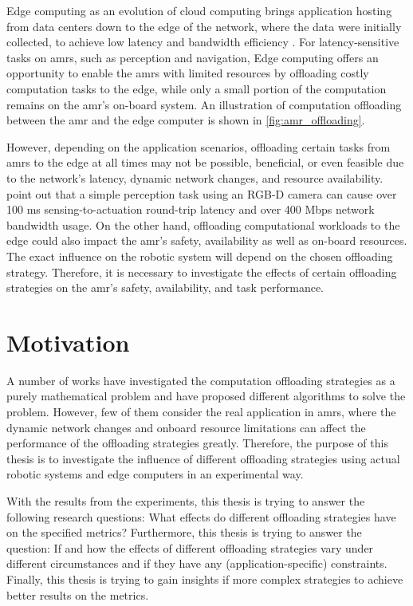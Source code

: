 Edge computing as an evolution of cloud computing brings application hosting from data centers down to the edge of the network, where the data were initially collected, to achieve low latency and bandwidth efficiency \cite{Lin2019}. For latency-sensitive tasks on \glspl{amr}, such as perception and navigation, Edge computing offers an opportunity to enable the \glspl{amr} with limited resources by offloading costly computation tasks to the edge, while only a small portion of the computation remains on the \gls{amr}'s on-board system. An illustration of computation offloading between the \gls{amr} and the edge computer is shown in \cref{fig:amr_offloading}.

However, depending on the application scenarios, offloading certain tasks from \glspl{amr} to the edge at all times may not be possible, beneficial, or even feasible due to the network's latency, dynamic network changes, and resource availability. \citeauthor*{Baxi2022} \cite{Baxi2022} point out that a simple perception task using an RGB-D camera can cause over 100 ms sensing-to-actuation round-trip latency and over 400 Mbps network bandwidth usage. On the other hand, offloading computational workloads to the edge could also impact the \gls{amr}'s safety, availability as well as on-board resources. The exact influence on the robotic system will depend on the chosen offloading strategy. Therefore, it is necessary to investigate the effects of certain offloading strategies on the \gls{amr}'s safety, availability, and task performance.

\section{Motivation}\label{sec:motivation}

A number of works have investigated the computation offloading strategies as a purely mathematical problem and have proposed different algorithms to solve the problem. However, few of them consider the real application in \glspl{amr}, where the dynamic network changes and onboard resource limitations can affect the performance of the offloading strategies greatly. Therefore, the purpose of this thesis is to investigate the influence of different offloading strategies using actual robotic systems and edge computers in an experimental way.

 With the results from the experiments, this thesis is trying to answer the following research questions: What effects do different offloading strategies have on the specified metrics? Furthermore, this thesis is trying to answer the question: If and how the effects of different offloading strategies vary under different circumstances and if they have any (application-specific) constraints. Finally, this thesis is trying to gain insights if more complex strategies to achieve better results on the metrics. 

